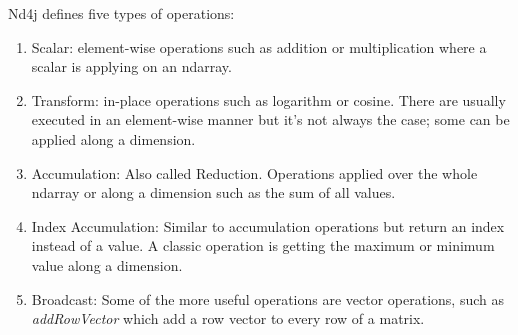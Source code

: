 Nd4j defines five types of operations:
\begin{enumerate}
\item Scalar: element-wise operations such as addition or multiplication where a scalar is applying on an ndarray.
\item Transform: in-place operations such as logarithm or cosine. There are usually executed in an element-wise manner but it's not always the case; some can be applied along a dimension.
\item Accumulation: Also called Reduction. Operations applied over the whole ndarray or along a dimension such as the sum of all values.
\item Index Accumulation: Similar to accumulation operations but return an index instead of a value. A classic operation is getting the maximum or minimum value along a dimension.
\item Broadcast: Some of the more useful operations are vector operations, such as \textit{addRowVector} which add a row vector to every row of a matrix.
\end{enumerate}
